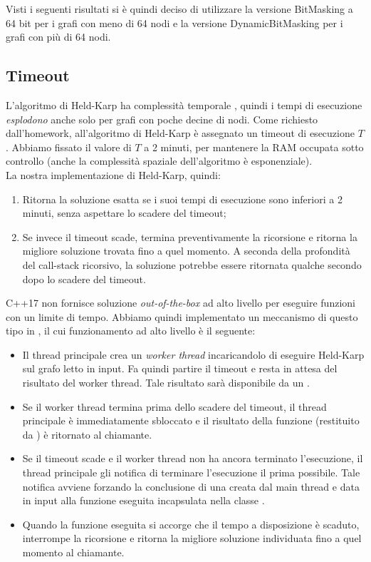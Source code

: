 Visti i seguenti risultati si è quindi deciso di utilizzare la versione BitMasking a 64 bit per i grafi con meno di 64 nodi e la versione DynamicBitMasking per i grafi con più di 64 nodi.

\subsection{Timeout}

\noindent L'algoritmo di Held-Karp ha complessità temporale \complexityHeldKarpTime{}, quindi i tempi di esecuzione \textit{esplodono} anche solo per grafi con poche decine di nodi. Come richiesto dall'homework, all'algoritmo di Held-Karp è assegnato un timeout di esecuzione $T$. Abbiamo fissato il valore di $T$ a 2 minuti, per mantenere la RAM occupata sotto controllo (anche la complessità spaziale dell'algoritmo è esponenziale).\\

\noindent La nostra implementazione di Held-Karp, quindi:

\begin{enumerate}
    \item Ritorna la soluzione esatta se i suoi tempi di esecuzione sono inferiori a 2 minuti, senza aspettare lo scadere del timeout;
    \item Se invece il timeout scade, termina preventivamente la ricorsione e ritorna la migliore soluzione trovata fino a quel momento. A seconda della profondità del call-stack ricorsivo, la soluzione potrebbe essere ritornata qualche secondo dopo lo scadere del timeout.
\end{enumerate}

\noindent C++17 non fornisce soluzione \textit{out-of-the-box} ad alto livello per eseguire funzioni con un limite di tempo. Abbiamo quindi implementato un meccanismo di questo tipo in , il cui funzionamento ad alto livello è il seguente:

\begin{itemize}
    \item Il thread principale crea un \textit{worker thread} incaricandolo di eseguire Held-Karp sul grafo letto in input. Fa quindi partire il timeout e resta in attesa del risultato del worker thread. Tale risultato sarà disponibile da un .
    \item Se il worker thread termina prima dello scadere del timeout, il thread principale è immediatamente sbloccato e il risultato della funzione (restituito da ) è ritornato al chiamante.
    \item Se il timeout scade e il worker thread non ha ancora terminato l'esecuzione, il thread principale gli notifica di terminare l'esecuzione il prima possibile. Tale notifica avviene forzando la conclusione di una  creata dal main thread e data in input alla funzione eseguita incapsulata nella classe .
    \item Quando la funzione eseguita si accorge che il tempo a disposizione è scaduto, interrompe la ricorsione e ritorna la migliore soluzione individuata fino a quel momento al chiamante. 
\end{itemize}
